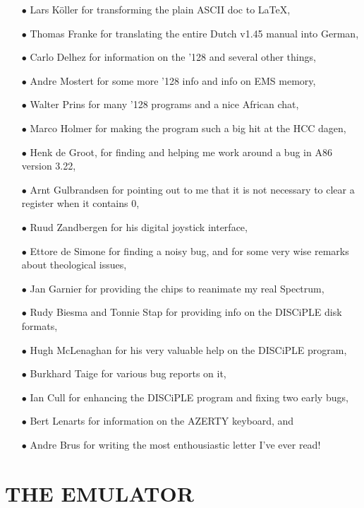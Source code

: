 \begin{itemize}
    \item[$\bullet$]  Lars K\"oller for transforming the plain ASCII doc to \LaTeX,
    \item[$\bullet$]  Thomas Franke for translating the entire Dutch v1.45 manual into
            German,
    \item[$\bullet$]  Carlo Delhez for information on the '128 and several other things,
    \item[$\bullet$]  Andre Mostert for some more '128 info and info on EMS memory,
    \item[$\bullet$]  Walter Prins for many '128 programs and a nice African chat,
    \item[$\bullet$]  Marco Holmer for making the program such a big hit at the HCC dagen,
    \item[$\bullet$]  Henk de Groot, for finding and helping me work around a bug in A86
            version 3.22,
    \item[$\bullet$]  Arnt Gulbrandsen for pointing out to me that it is not necessary to
            clear a register when it contains 0,
    \item[$\bullet$]  Ruud Zandbergen for his digital joystick interface,
    \item[$\bullet$]  Ettore de Simone for finding a noisy bug, and for some very wise
            remarks about theological issues,
    \item[$\bullet$]  Jan Garnier for providing the chips to reanimate my real Spectrum,
    \item[$\bullet$]  Rudy Biesma and Tonnie Stap for providing info on the DISCiPLE disk
            formats,
    \item[$\bullet$]  Hugh McLenaghan for his very valuable help on the DISCiPLE program,
    \item[$\bullet$]  Burkhard Taige for various bug reports on it,
    \item[$\bullet$]  Ian Cull for enhancing the DISCiPLE program and fixing two early
            bugs,
    \item[$\bullet$]  Bert Lenarts for information on the AZERTY keyboard, and
    \item[$\bullet$]  Andre Brus for writing the most enthousiastic letter I've ever
            read!
\end{itemize}


\newpage

\section{THE EMULATOR}


